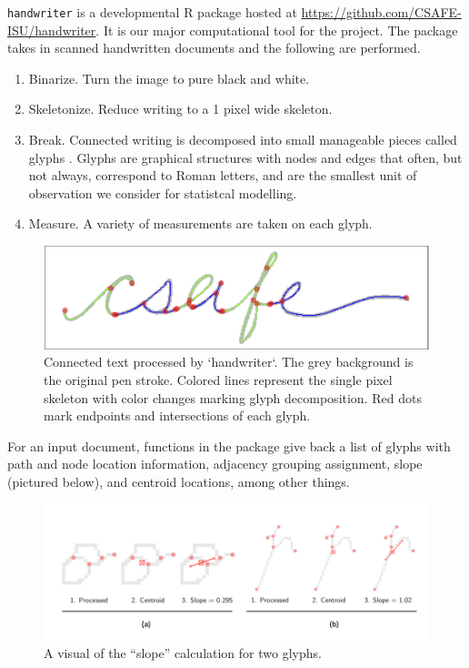 \documentclass[]{book}
\providecommand{\tightlist}{%
  \setlength{\itemsep}{0pt}\setlength{\parskip}{0pt}}
\begin{document}
\texttt{handwriter} is a developmental R package hosted at \url{https://github.com/CSAFE-ISU/handwriter}. It is our major computational tool for the project. The package takes in scanned handwritten documents and the following are performed.

\begin{enumerate}
\def\labelenumi{\arabic{enumi}.}
\tightlist
\item
   Binarize. Turn the image to pure black and white.
\item
   Skeletonize. Reduce writing to a 1 pixel wide skeleton.
\item
   Break. Connected writing is decomposed into small manageable pieces called glyphs . Glyphs are graphical structures with nodes and edges that often, but not always, correspond to Roman letters, and are the smallest unit of observation we consider for statistcal modelling.
\item
   Measure. A variety of measurements are taken on each glyph.
\end{enumerate}

\begin{figure}

{\centering \includegraphics[width=0.5\linewidth]{images/handwriting/amy/handwriter_csafe} 

}

\caption{Connected text processed by `handwriter`. The grey background is the original pen stroke. Colored lines represent the single pixel skeleton with color changes marking glyph decomposition. Red dots mark endpoints and intersections of each glyph.}\label{fig:unnamed-chunk-28}
\end{figure}

For an input document, functions in the package give back a list of glyphs with path and node location information, adjacency grouping assignment, slope (pictured below), and centroid locations, among other things.

\begin{figure}

{\centering \includegraphics[width=0.9\linewidth]{images/handwriting/amy/handwriter_slopecalc} 

}

\caption{A visual of the ``slope'' calculation for two glyphs.}\label{fig:unnamed-chunk-29}
\end{figure}
\end{document}
